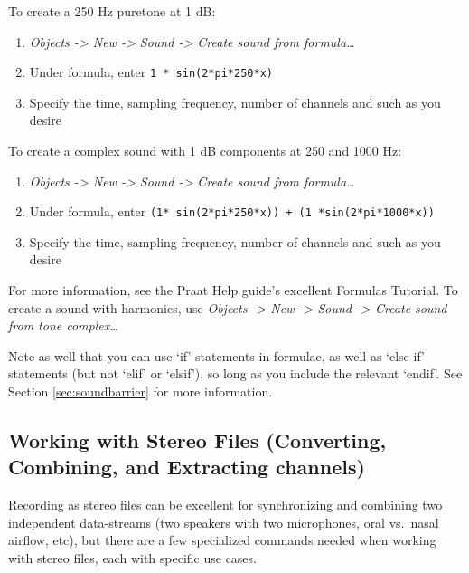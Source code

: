 \documentclass[11pt]{article}
\def\tightlist{}
\begin{document}
To create a 250 Hz puretone at 1 dB:

\begin{enumerate}
\def\labelenumi{\arabic{enumi}.}
\tightlist
\item
  \emph{Objects -\textgreater{} New -\textgreater{} Sound
  -\textgreater{} Create sound from formula\ldots{}}
\item
  Under formula, enter \texttt{1 * sin(2*pi*250*x)}
\item
  Specify the time, sampling frequency, number of channels and such as
  you desire
\end{enumerate}

To create a complex sound with 1 dB components at 250 and 1000 Hz:

\begin{enumerate}
\def\labelenumi{\arabic{enumi}.}
\tightlist
\item
  \emph{Objects -\textgreater{} New -\textgreater{} Sound
  -\textgreater{} Create sound from formula\ldots{}}
\item
  Under formula, enter
  \texttt{(1* sin(2*pi*250*x)) + (1 *sin(2*pi*1000*x))}
\item
  Specify the time, sampling frequency, number of channels and such as
  you desire
\end{enumerate}

For more information, see the Praat Help guide's excellent Formulas
Tutorial. To create a sound with harmonics, use \emph{Objects
-\textgreater{} New -\textgreater{} Sound -\textgreater{} Create sound
from tone complex\ldots{}}

Note as well that you can use `if' statements in formulae, as well as
`else if' statements (but not `elif' or `elsif'), so long as you include
the relevant `endif'. See Section \ref{sec:soundbarrier} for more
information.

\hypertarget{working-with-stereo-files-converting-combining-and-extracting-channels}{%
\subsection{Working with Stereo Files (Converting, Combining, and
Extracting
channels)}\label{working-with-stereo-files-converting-combining-and-extracting-channels}}

\label{sec:stereomanip}

Recording as stereo files can be excellent for synchronizing and
combining two independent data-streams (two speakers with two
microphones, oral vs.~nasal airflow, etc), but there are a few
specialized commands needed when working with stereo files, each with
specific use cases.
\end{document}
